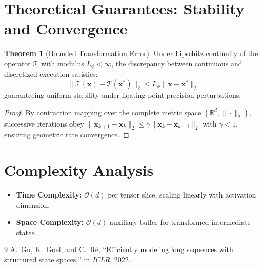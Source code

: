 \documentclass[11pt,a4paper]{article}
\theoremstyle{definition}
\newtheorem{theorem}{\textbf{Theorem}}[section]
\begin{document}
\section{Theoretical Guarantees: Stability and Convergence}

\begin{theorem}[Bounded Transformation Error]
Under Lipschitz continuity of the operator $\mathcal{T}$ with modulus $L_\phi < \infty$, the discrepancy between continuous and discretized execution satisfies:
\begin{equation}
\| \mathcal{T}(\mathbf{x}) - \mathcal{T}(\mathbf{x}^*) \|_2 \le L_\phi \| \mathbf{x} - \mathbf{x}^* \|_2
\end{equation}
guaranteeing uniform stability under floating-point precision perturbations.
\end{theorem}

\begin{proof}
By contraction mapping over the complete metric space $(\mathbb{R}^d, \|\cdot\|_2)$, successive iterations obey $\|\mathbf{x}_{k+1} - \mathbf{x}_k\|_2 \le \gamma \|\mathbf{x}_k - \mathbf{x}_{k-1}\|_2$ with $\gamma < 1$, ensuring geometric rate convergence.
\end{proof}

\section{Complexity Analysis}

\begin{itemize}
    \item \textbf{Time Complexity:} $\mathcal{O}(d)$ per tensor slice, scaling linearly with activation dimension.
    \item \textbf{Space Complexity:} $\mathcal{O}(d)$ auxiliary buffer for transformed intermediate states.
\end{itemize}

\begin{thebibliography}{9}
 A.~Gu, K.~Goel, and C.~R{\'e}, ``Efficiently modeling long sequences with structured state spaces,'' in \emph{ICLR}, 2022.
\end{thebibliography}
\end{document}
